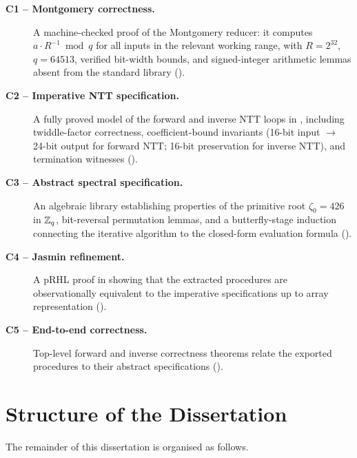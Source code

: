 \begin{description}
  \item[\textbf{C1 -- Montgomery correctness.}]
    A machine-checked proof of the Montgomery reducer: it computes
    $a \cdot R^{-1} \bmod q$ for all inputs in the relevant working range,
    with $R = 2^{32}$, $q = 64513$, verified bit-width bounds, and
    signed-integer arithmetic lemmas absent from the \easycrypt{} standard
    library ().

  \item[\textbf{C2 -- Imperative NTT specification.}]
    A fully proved \easycrypt{} model of the forward and inverse NTT loops in
    , including twiddle-factor correctness, coefficient-bound
    invariants (16-bit input $\to$ 24-bit output for forward NTT; 16-bit
    preservation for inverse NTT), and termination witnesses
    ().

  \item[\textbf{C3 -- Abstract spectral specification.}]
    An algebraic library establishing properties of the primitive root
    $\zeta_0 = 426$ in $\mathbb{Z}_q$, bit-reversal permutation lemmas, and a
    butterfly-stage induction connecting the iterative algorithm to the
    closed-form evaluation formula ().

  \item[\textbf{C4 -- Jasmin refinement.}]
    A pRHL proof in  showing that the extracted \jasmin{}
    procedures are observationally equivalent to the imperative specifications
    up to array representation ().

  \item[\textbf{C5 -- End-to-end correctness.}]
    Top-level forward and inverse correctness theorems relate the exported
    \jasmin{} procedures to their abstract specifications
    ().
\end{description}

\section{Structure of the Dissertation}

The remainder of this dissertation is organised as follows.

